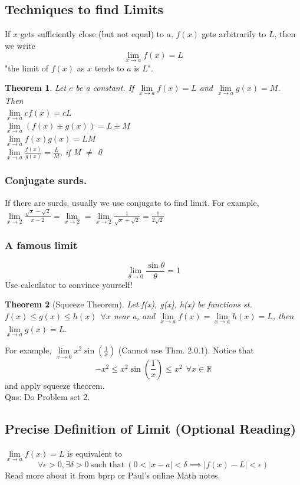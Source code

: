 \documentclass[a4paper,12pt,oneside]{book}
\newtheorem{theorem}{Theorem}[section]
\begin{document}
\subsection{Techniques to find Limits}
If $x$ gets sufficiently close (but not equal) to $a$, $f(x)$ gets arbitrarily to $L$, then we write  \[ \lim_{x\to a} f(x) = L \] "the limit of $f(x)$ as $x$ tends to $a$ is $L$".
\begin{theorem}
Let $c$ be a constant. If $\lim\limits_{x \to a} f(x) = L$ and $\lim\limits_{x \to a} g(x) = M$.  Then \\ 
$\lim\limits_{x \to a} cf(x) = cL$\\
$\lim\limits_{x \to a} (f(x) \pm g(x)) = L \pm M$\\
$\lim\limits_{x \to a} f(x)g(x) = LM$\\
$\lim\limits_{x \to a} \frac{f(x)}{g(x)} = \frac{L}{M}$, if M $\neq$ 0
\end{theorem}
\subsubsection*{Conjugate surds.} If there are surds, usually we use conjugate to find limit. For example, $\lim\limits_{x \to 2} \frac{\sqrt{x} - \sqrt{2}}{x-2} = \lim\limits_{x \to 2} $\:\:\:\:\:\:\:\:\:\:\:\:\:\:\:\:\:\:\:\:\: = $\lim\limits_{x \to 2} \frac{1}{\sqrt{x}+\sqrt{2}} = \frac{1}{2\sqrt{2}}$
\subsubsection{A famous limit}
\[ \lim_{\theta\to 0} \frac{\sin \theta}{\theta}  =1\] Use calculator to convince yourself!
\begin{theorem}[Squeeze Theorem]
Let f(x), g(x), h(x) be functions st.
$f(x) \leq g(x) \leq h(x) \:\: \forall x$ near a, and $\lim\limits_{x \to a} f(x) =  \lim\limits_{x \to a} h(x) = L$, then $\lim\limits_{x \to a} g(x) = L$.
\end{theorem}
For example, $\lim\limits_{x \to 0} x^2\sin(\frac{1}{x})$ (Cannot use Thm. 2.0.1). Notice that $$-x^2 \leq x^2\sin(\frac{1}{x}) \leq x^2 \:\: \forall x \in \mathbb{R}$$
and apply squeeze theorem. \qedsymbol\\
Qns: Do Problem set 2.
\subsection{Precise Definition of Limit (Optional Reading)}
$\lim\limits_{x \to a} f(x) = L$ is equivalent to \[\forall \epsilon > 0, \exists \delta > 0 \:\text{such that}\: (0<|x-a|<\delta \implies |f(x) - L|<\epsilon)\] Read more about it from bprp or Paul's online Math notes.
\end{document}
